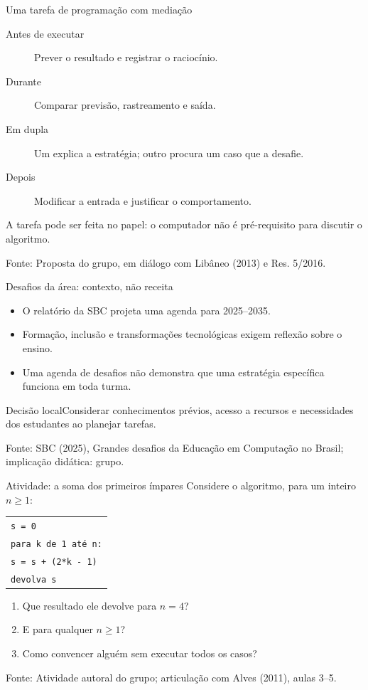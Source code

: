 \documentclass[aspectratio=169,11pt]{beamer}
\newcommand{\fonte}[1]{\par\vfill{\tiny\color{gray}Fonte: #1}}
\begin{document}
\begin{frame}{Uma tarefa de programação com mediação}
\begin{description}\item[Antes de executar] Prever o resultado e registrar o raciocínio.\item[Durante] Comparar previsão, rastreamento e saída.\item[Em dupla] Um explica a estratégia; outro procura um caso que a desafie.\item[Depois] Modificar a entrada e justificar o comportamento.\end{description}\medskip A tarefa pode ser feita no papel: o computador não é pré-requisito para discutir o algoritmo.
\fonte{Proposta do grupo, em diálogo com Libâneo (2013) e Res. 5/2016.}
\end{frame}
\begin{frame}{Desafios da área: contexto, não receita}
\begin{itemize}\item O relatório da SBC projeta uma agenda para 2025--2035.\item Formação, inclusão e transformações tecnológicas exigem reflexão sobre o ensino.\item Uma agenda de desafios não demonstra que uma estratégia específica funciona em toda turma.\end{itemize}\begin{block}{Decisão local}Considerar conhecimentos prévios, acesso a recursos e necessidades dos estudantes ao planejar tarefas.\end{block}
\fonte{SBC (2025), Grandes desafios da Educação em Computação no Brasil; implicação didática: grupo.}
\end{frame}
\begin{frame}{Atividade: a soma dos primeiros ímpares}
Considere o algoritmo, para um inteiro $n\geq1$:
\begin{center}\begin{tabular}{l}\texttt{s = 0}\\\texttt{para k de 1 até n:}\\\quad\texttt{s = s + (2*k - 1)}\\\texttt{devolva s}\end{tabular}\end{center}
\begin{enumerate}\item Que resultado ele devolve para $n=4$?\item E para qualquer $n\geq1$?\item Como convencer alguém sem executar todos os casos?\end{enumerate}
\fonte{Atividade autoral do grupo; articulação com Alves (2011), aulas 3--5.}
\end{frame}
\end{document}
